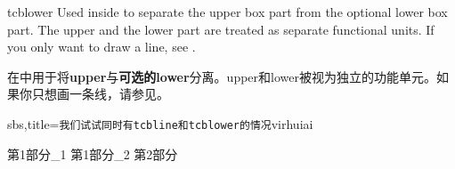 \begin{docCommand}{tcblower}{}
Used inside  to separate the upper box part from
the optional lower box part. The upper and the lower part are treated
as separate functional units. If you only want to draw a line, see .

在中用于将{\bf upper}与{\bf 可选的lower}分离。upper和lower被视为独立的功能单元。如果你只想画一条线，请参见。

\begin{dispExample*}{sbs,title={{\tt 我们试试同时有tcbline和tcblower的情况}\hfill virhuiai}}
\begin{tcolorbox}
第1部分\_1
\tcbline
第1部分\_2
\tcblower
第2部分
\end{tcolorbox}
\end{dispExample*}
\end{docCommand} 